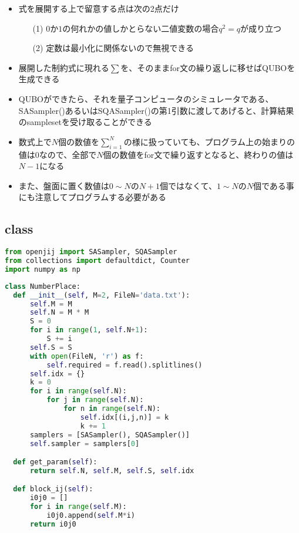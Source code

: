 \documentclass[uplatex,dvipdfmx,a4paper,11pt,oneside,openany]{jsbook}
\begin{document}
\begin{itemize}
\item 式を展開する上で留意する点は次の2点だけ
  \begin{itemize}
  \item[(1)] $0$か$1$の何れかの値しかとらない二値変数の場合$q^2=q$が成り立つ
  \item[(2)] 定数は最小化に関係ないので無視できる
  \end{itemize}
\item 展開した制約式に現れる$\sum$を、そのままfor文の繰り返しに移せばQUBOを生成できる
\item QUBOができたら、それを量子コンピュータのシミュレータである、SASampler()あるいはSQASampler()の第1引数に渡してあげると、計算結果のsamplesetを受け取ることができる
\item 数式上で$N$個の数値を$\sum_{i=1}^N$の様に扱っていても、プログラム上の始まりの値は$0$なので、全部で$N$個の数値をfor文で繰り返すとなると、終わりの値は$N-1$になる
\item また、盤面に置く数値は$0\sim N$の$N+1$個ではなくて、$1\sim N$の$N$個である事にも注意してプログラムする必要がある
\end{itemize}

\subsection{class}

\begin{lstlisting}[language=Python]
from openjij import SASampler, SQASampler
from collections import defaultdict, Counter
import numpy as np
\end{lstlisting}

\begin{lstlisting}[language=Python]
class NumberPlace:
  def __init__(self, M=2, FileN='data.txt'):
      self.M = M
      self.N = M * M
      S = 0
      for i in range(1, self.N+1):
          S += i
      self.S = S
      with open(FileN, 'r') as f:
          self.required = f.read().splitlines()
      self.idx = {}
      k = 0
      for i in range(self.N):
          for j in range(self.N):
              for n in range(self.N):
                  self.idx[(i,j,n)] = k
                  k += 1
      samplers = [SASampler(), SQASampler()]
      self.sampler = samplers[0]

  def get_param(self):
      return self.N, self.M, self.S, self.idx

  def block_ij(self):
      i0j0 = []
      for i in range(self.M):
          i0j0.append(self.M*i)
      return i0j0
\end{lstlisting}
\end{document}
